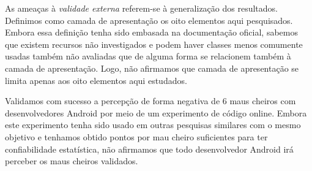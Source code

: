 As ameaças à \textit{validade externa} referem-se à generalização dos resultados. Definimos como camada de apresentação os oito elementos aqui pesquisados. Embora essa definição tenha sido embasada na documentação oficial, sabemos que existem recursos não investigados e podem haver classes menos comumente usadas também não avaliadas que de alguma forma se relacionem também à camada de apresentação. Logo, não afirmamos que camada de apresentação se limita apenas aos oito elementos aqui estudados.

Validamos com sucesso a percepção de forma negativa de 6 maus cheiros com desenvolvedores Android por meio de um experimento de código online. Embora este experimento tenha sido usado em outras pesquisas similares com o mesmo objetivo \cite{AnicheSmellsMVC:17, MvcSmells:16, Palomba_Do_2014} e tenhamos obtido pontos por mau cheiro suficientes para ter confiabilidade estatística, não afirmamos que todo desenvolvedor Android irá perceber os maus cheiros validados. 
